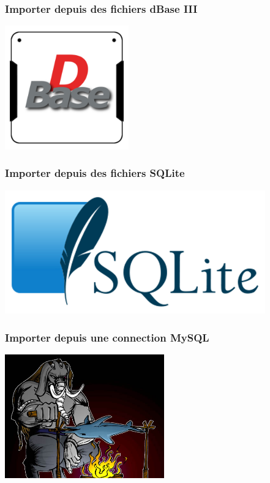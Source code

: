 \documentclass{beamer}
\begin{document}
\begin{frame}
  \frametitle{Importer depuis des fichiers dBase III}


  \begin{center}
    \includegraphics[height=2.1in]{dBase.png}
  \end{center}
\end{frame}

\begin{frame}
  \frametitle{Importer depuis des fichiers SQLite}


  \begin{center}
    \includegraphics[height=2.1in]{SQLite.png}
  \end{center}
\end{frame}

\begin{frame}
  \frametitle{Importer depuis une connection MySQL}


  \begin{center}
    \includegraphics[height=2.1in]{postgresql_versus_mysql.jpg}
  \end{center}
\end{frame}
\end{document}
